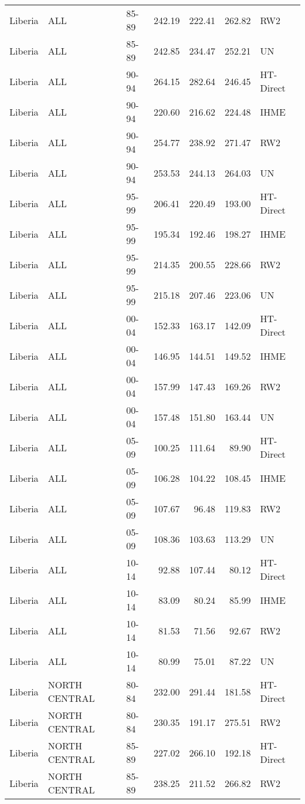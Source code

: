 \begin{longtable}{lllrrrl}
  Liberia & ALL & 85-89 & 242.19 & 222.41 & 262.82 & RW2 \\ 
  Liberia & ALL & 85-89 & 242.85 & 234.47 & 252.21 & UN \\ 
  Liberia & ALL & 90-94 & 264.15 & 282.64 & 246.45 & HT-Direct \\ 
  Liberia & ALL & 90-94 & 220.60 & 216.62 & 224.48 & IHME \\ 
  Liberia & ALL & 90-94 & 254.77 & 238.92 & 271.47 & RW2 \\ 
  Liberia & ALL & 90-94 & 253.53 & 244.13 & 264.03 & UN \\ 
  Liberia & ALL & 95-99 & 206.41 & 220.49 & 193.00 & HT-Direct \\ 
  Liberia & ALL & 95-99 & 195.34 & 192.46 & 198.27 & IHME \\ 
  Liberia & ALL & 95-99 & 214.35 & 200.55 & 228.66 & RW2 \\ 
  Liberia & ALL & 95-99 & 215.18 & 207.46 & 223.06 & UN \\ 
  Liberia & ALL & 00-04 & 152.33 & 163.17 & 142.09 & HT-Direct \\ 
  Liberia & ALL & 00-04 & 146.95 & 144.51 & 149.52 & IHME \\ 
  Liberia & ALL & 00-04 & 157.99 & 147.43 & 169.26 & RW2 \\ 
  Liberia & ALL & 00-04 & 157.48 & 151.80 & 163.44 & UN \\ 
  Liberia & ALL & 05-09 & 100.25 & 111.64 & 89.90 & HT-Direct \\ 
  Liberia & ALL & 05-09 & 106.28 & 104.22 & 108.45 & IHME \\ 
  Liberia & ALL & 05-09 & 107.67 & 96.48 & 119.83 & RW2 \\ 
  Liberia & ALL & 05-09 & 108.36 & 103.63 & 113.29 & UN \\ 
  Liberia & ALL & 10-14 & 92.88 & 107.44 & 80.12 & HT-Direct \\ 
  Liberia & ALL & 10-14 & 83.09 & 80.24 & 85.99 & IHME \\ 
  Liberia & ALL & 10-14 & 81.53 & 71.56 & 92.67 & RW2 \\ 
  Liberia & ALL & 10-14 & 80.99 & 75.01 & 87.22 & UN \\ 
  Liberia & NORTH CENTRAL & 80-84 & 232.00 & 291.44 & 181.58 & HT-Direct \\ 
  Liberia & NORTH CENTRAL & 80-84 & 230.35 & 191.17 & 275.51 & RW2 \\ 
  Liberia & NORTH CENTRAL & 85-89 & 227.02 & 266.10 & 192.18 & HT-Direct \\ 
  Liberia & NORTH CENTRAL & 85-89 & 238.25 & 211.52 & 266.82 & RW2 \\ 

\end{longtable}
